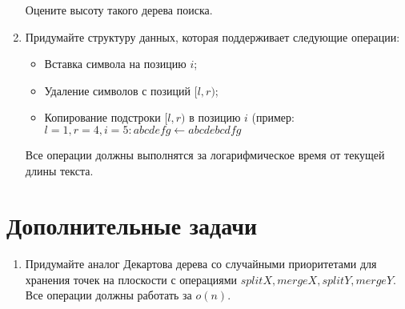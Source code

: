 \begin{enumerate}
	Оцените высоту такого дерева поиска.
	
	\item Придумайте структуру данных, которая поддерживает следующие операции:
	
	\begin{itemize}
		\item Вставка символа на позицию $i$;
		\item Удаление символов с позиций $[l, r)$;
		\item Копирование подстроки $[l, r)$ в позицию $i$ (пример: $l = 1, r = 4, i = 5 : abcdefg \leftarrow abcdebcdfg$
	\end{itemize}
	
	Все операции должны выполнятся за логарифмическое время от текущей длины текста.
	
\end{enumerate}

\section*{Дополнительные задачи}
\begin{enumerate}
	\item Придумайте аналог Декартова дерева со случайными приоритетами для хранения точек на плоскости с операциями $splitX, mergeX, splitY, mergeY$. Все операции должны работать за $o(n)$.
\end{enumerate}

